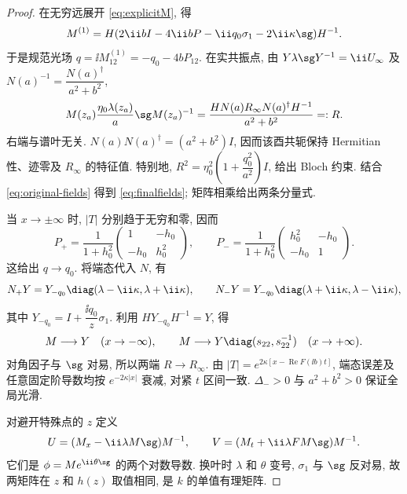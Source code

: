 \begin{proof}
在无穷远展开 \eqref{eq:explicitM}, 得
\[
M^{(1)}=H(2\ii bI-4\ii bP-\ii q_0\sigma_1-2\ii\kappa\sg)H^{-1}.
\]
于是规范光场 $q=\ii M^{(1)}_{12}=-q_0-4bP_{12}$. 在实共振点, 由 $Y\lambda\sg Y^{-1}=\ii U_\infty$ 及 $N(a)^{-1}=\dfrac{N(a)^\dagger}{a^2+b^2}$,
\begin{equation}\label{eq:direct-medium}
M(z_a)\dfrac{\eta_0\lambda(z_a)}{a}\sg M(z_a)^{-1}
=\dfrac{HN(a)R_\infty N(a)^\dagger H^{-1}}{a^2+b^2}=:R.
\end{equation}
右端与谱叶无关. $N(a)N(a)^\dagger=(a^2+b^2)I$, 因而该酉共轭保持 Hermitian 性、迹零及 $R_\infty$ 的特征值. 特别地,
$R^2=\eta_0^2\left(1+\dfrac{q_0^2}{a^2}\right)I$, 给出 Bloch 约束. 结合 \eqref{eq:original-fields} 得到 \eqref{eq:finalfields}; 矩阵相乘给出两条分量式.

当 $x\to\pm\infty$ 时, $|T|$ 分别趋于无穷和零, 因而
\begin{equation}\label{eq:Pends}
P_+=\dfrac{1}{1+h_0^2}\begin{pmatrix}1&-h_0\\-h_0&h_0^2\end{pmatrix},\qquad
P_-=\dfrac{1}{1+h_0^2}\begin{pmatrix}h_0^2&-h_0\\-h_0&1\end{pmatrix}.
\end{equation}
这给出 $q\to q_0$. 将端态代入 $N$, 有
\[
N_+Y=Y_{-q_0}\diag(\lambda-\ii\kappa,\lambda+\ii\kappa),\qquad
N_-Y=Y_{-q_0}\diag(\lambda+\ii\kappa,\lambda-\ii\kappa),
\]
其中 $Y_{-q_0}=I+\dfrac{\ii q_0}{z}\sigma_1$. 利用 $HY_{-q_0}H^{-1}=Y$, 得
\begin{equation}\label{eq:direct-M-ends}
M\longrightarrow Y\quad(x\to-\infty),\qquad
M\longrightarrow Y\diag(s_{22},s_{22}^{-1})\quad(x\to+\infty).
\end{equation}
对角因子与 $\sg$ 对易, 所以两端 $R\to R_\infty$. 由 $|T|=e^{2\kappa[x-\operatorname{Re}F(\ii b)t]}$, 端态误差及任意固定阶导数均按 $e^{-2\kappa|x|}$ 衰减, 对紧 $t$ 区间一致. $\Delta_->0$ 与 $a^2+b^2>0$ 保证全局光滑.

对避开特殊点的 $z$ 定义
\begin{equation}\label{eq:inverse-log-lax}
U=(M_x-\ii\lambda M\sg)M^{-1},\qquad
V=(M_t+\ii\lambda F M\sg)M^{-1}.
\end{equation}
它们是 $\phi=Me^{\ii\theta\sg}$ 的两个对数导数. 换叶时 $\lambda$ 和 $\theta$ 变号, $\sigma_1$ 与 $\sg$ 反对易, 故两矩阵在 $z$ 和 $h(z)$ 取值相同, 是 $k$ 的单值有理矩阵.


\end{proof}
